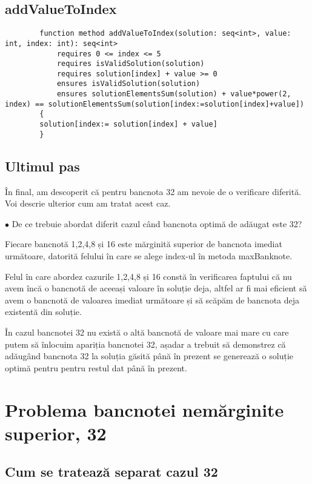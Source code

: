     \subsection{addValueToIndex}
    \begin{lstlisting}
        function method addValueToIndex(solution: seq<int>, value: int, index: int): seq<int>
            requires 0 <= index <= 5
            requires isValidSolution(solution)
            requires solution[index] + value >= 0
            ensures isValidSolution(solution)
            ensures solutionElementsSum(solution) + value*power(2, index) == solutionElementsSum(solution[index:=solution[index]+value])
        {
        solution[index:= solution[index] + value]
        }
    \end{lstlisting}

    
    \subsection{Ultimul pas}
    În final, am descoperit că pentru bancnota 32 am nevoie de o verificare diferită. Voi descrie ulterior cum am tratat acest caz.\par
    $\bullet$ De ce trebuie abordat diferit cazul când bancnota optimă de adăugat este 32?\par
    Fiecare bancnotă 1,2,4,8 și 16 este mărginită superior de bancnota imediat următoare, datorită felului în care 
    se alege index-ul în metoda maxBanknote.\par
    Felul în care abordez cazurile 1,2,4,8 și 16 constă în verificarea faptului că 
    nu avem încă o bancnotă de aceeași valoare în soluție deja, altfel ar fi mai eficient să avem  
    o bancnotă de valoarea imediat următoare și să scăpăm de bancnota deja existentă din soluție.\par
    În cazul bancnotei 32 nu există o altă bancnotă de valoare mai mare cu care putem să înlocuim apariția bancnotei 32,
    așadar a trebuit să demonstrez că adăugând bancnota 32 la soluția găsită până în prezent se generează o soluție optimă pentru 
    pentru restul dat până în prezent.   
    
    
    
    
\section{Problema bancnotei nemărginite superior, 32}

\subsection{Cum se tratează separat cazul 32}

